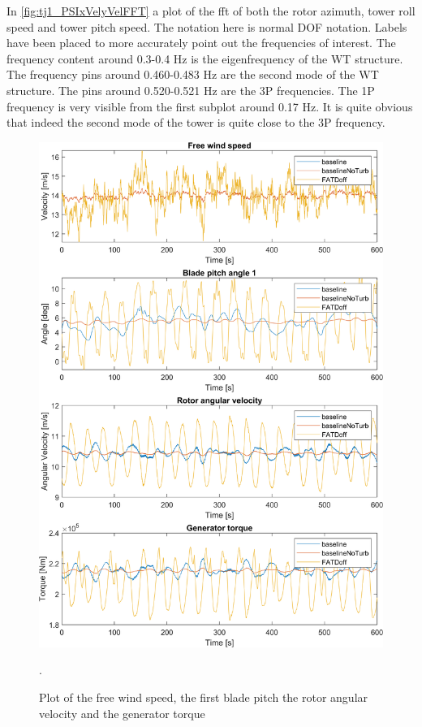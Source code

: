 In \cref{fig:tj1_PSIxVelyVelFFT} a plot of the fft of both the rotor azimuth, tower roll speed and tower pitch speed. The notation here is normal DOF notation. Labels have been placed to more accurately point out the frequencies of interest. The frequency content around 0.3-0.4 Hz is the eigenfrequency of the WT structure. The frequency pins around 0.460-0.483 Hz are the second mode of the WT structure. The pins around 0.520-0.521 Hz are the 3P frequencies. The 1P frequency is very visible from the first subplot around 0.17 Hz. It is quite obvious that indeed the second mode of the tower is quite close to the 3P frequency. 

\begin{figure}[h]
	\centering
	\includegraphics[width=0.8\linewidth]{Graphics/TestResults/tj01/VfreeToMgen.png}
	\caption{Plot of the free wind speed, the first blade pitch the rotor angular velocity and the generator torque}.
	\label{fig:tj1:vfreetomgen}
\end{figure}

